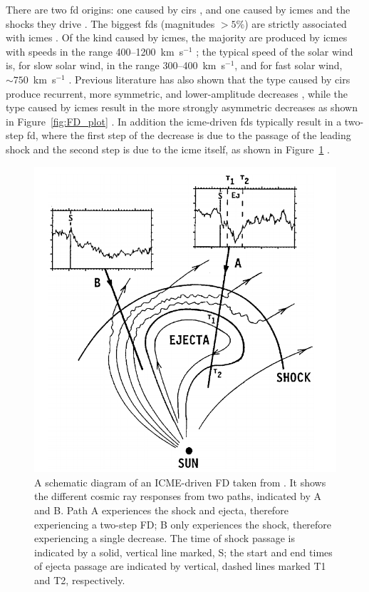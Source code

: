 There are two \gls{fd} origins: one caused by \glspl{cir} \citep{dumbovic_forbush_2016}, and one caused by \glspl{icme} and the shocks they drive \citep{belov_forbush_2008}. The biggest \glspl{fd} (magnitudes $> 5\%$) are strictly associated with \glspl{icme} \citep{belov_what_2001}. Of the kind caused by \glspl{icme}, the majority are produced by \glspl{icme} with speeds in the range 400--1200~km~s$^{-1}$ \citep{lingri_forbush_2016}; the typical speed of the solar wind is, for slow solar wind, in the range 300--400~km~s$^{-1}$, and for fast solar wind, $\sim 750$~km~s$^{-1}$ \citep{owens_heliospheric_2013}. Previous literature has also shown that the type caused by \glspl{cir} produce recurrent, more symmetric, and lower-amplitude decreases \citep{dumbovic_cosmic_2012}, while the type caused by \glspl{icme} result in the more strongly asymmetric decreases as shown in Figure~\ref{fig:FD_plot} \citep{lockwood_forbush_1971, cane_coronal_2000, dumbovic_cosmic_2012}. In addition the \gls{icme}-driven \glspl{fd} typically result in a two-step \gls{fd}, where the first step of the decrease is due to the passage of the leading shock and the second step is due to the \gls{icme} itself, as shown in Figure~\ref{fig:FD_CME} \citep{cane_coronal_2000}.

\begin{figure}[ht!]
	\centering
	\includegraphics[width=0.75\columnwidth]{FD_CME.png}
	\caption{A schematic diagram of an ICME-driven FD taken from \citet{cane_coronal_2000}. It shows the different cosmic ray responses from two paths, indicated by A and B. Path A experiences the shock and ejecta, therefore experiencing a two-step FD; B only experiences the shock, therefore experiencing a single decrease. The time of shock passage is indicated by a solid, vertical line marked, S; the start and end times of ejecta passage are indicated by vertical, dashed lines marked T1 and T2, respectively.}
	\label{fig:FD_CME}
\end{figure}

